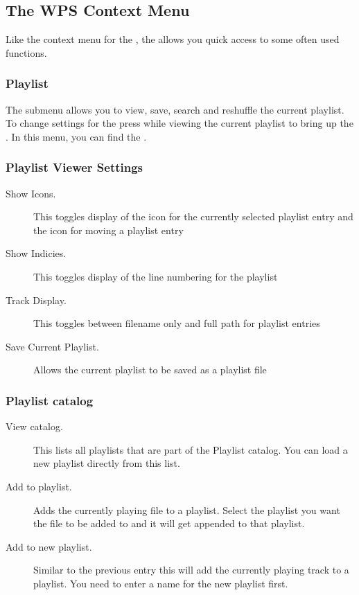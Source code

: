 \subsection{\label{sec:contextmenu}The WPS Context Menu}
Like the context menu for the , the  
allows you quick access to some often used functions. 

\subsubsection{Playlist}
The  submenu allows you to view, save, search and
reshuffle the current playlist. To change settings for the
 press \ActionStdContext{} while viewing the current
playlist to bring up the . In this menu, you
can find the .

\subsubsection{Playlist Viewer Settings}
  \begin{description}
    \item[Show Icons.] This toggles display of the icon for the currently 
    selected playlist entry and the icon for moving a playlist entry
    \item[Show Indicies.] This toggles display of the line numbering for
       the playlist
    \item[Track Display.] This toggles between filename only and full path
       for playlist entries
    \item[Save Current Playlist.] Allows the current playlist to be saved as
       a  playlist file
  \end{description}

    
\subsubsection{Playlist catalog}
  \begin{description}
    \item [View catalog.] This lists all playlists that are part of the
    Playlist catalog. You can load a new playlist directly from this list.
    \item [Add to playlist.] Adds the currently playing file to a playlist.
    Select the playlist you want the file to be added to and it will get
    appended to that playlist.
    \item [Add to new playlist.] Similar to the previous entry this will
    add the currently playing track to a playlist. You need to enter a name
    for the new playlist first.
  \end{description}

